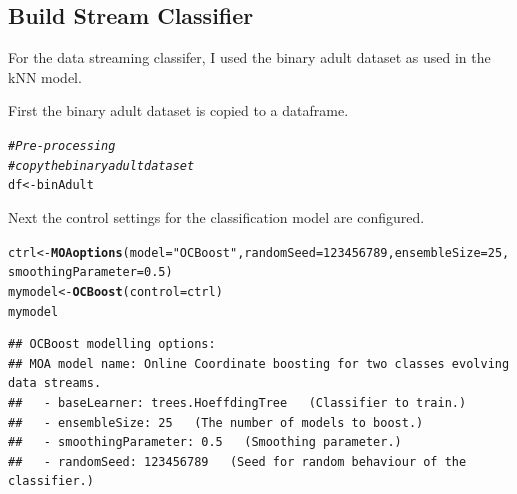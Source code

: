 \documentclass[10pt  ,usenames, dvipsnames]{article}\usepackage[]{graphicx}\usepackage[]{color}
\makeatletter
\newcommand{\hlnum}[1]{\textcolor[rgb]{0.686,0.059,0.569}{#1}}%
\newcommand{\hlstr}[1]{\textcolor[rgb]{0.192,0.494,0.8}{#1}}%
\newcommand{\hlcom}[1]{\textcolor[rgb]{0.678,0.584,0.686}{\textit{#1}}}%
\newcommand{\hlstd}[1]{\textcolor[rgb]{0.345,0.345,0.345}{#1}}%
\newcommand{\hlkwb}[1]{\textcolor[rgb]{0.69,0.353,0.396}{#1}}%
\newcommand{\hlkwc}[1]{\textcolor[rgb]{0.333,0.667,0.333}{#1}}%
\newcommand{\hlkwd}[1]{\textcolor[rgb]{0.737,0.353,0.396}{\textbf{#1}}}%
\newenvironment{kframe}{%
 \def\at@end@of@kframe{}%
 \ifinner\ifhmode%
  \def\at@end@of@kframe{\end{minipage}}%
  \begin{minipage}{\columnwidth}%
 \fi\fi%
 \def\FrameCommand##1{\hskip\@totalleftmargin \hskip-\fboxsep
 \colorbox{shadecolor}{##1}\hskip-\fboxsep
     \hskip-\linewidth \hskip-\@totalleftmargin \hskip\columnwidth}%
 \MakeFramed {\advance\hsize-\width
   \@totalleftmargin\z@ \linewidth\hsize
   \@setminipage}}%
 {\par\unskip\endMakeFramed%
 \at@end@of@kframe}
\newenvironment{knitrout}{}{} %
\makeatother
\begin{document}
\clearpage

\subsection{Build Stream Classifier}

For the data streaming classifer, I used the binary adult dataset as used in the kNN model.

First the binary adult dataset is copied to a dataframe.

\begin{knitrout}
\color{fgcolor}\begin{kframe}
\begin{alltt}
\hlcom{#Pre-processing}
\hlcom{#copy the binary adult dataset}
\hlstd{df} \hlkwb{<-} \hlstd{binAdult}
\end{alltt}
\end{kframe}
\end{knitrout}



Next the control settings for the classification model are configured.

\begin{knitrout}
\color{fgcolor}\begin{kframe}
\begin{alltt}
\hlstd{ctrl} \hlkwb{<-} \hlkwd{MOAoptions}\hlstd{(}\hlkwc{model} \hlstd{=} \hlstr{"OCBoost"}\hlstd{,} \hlkwc{randomSeed} \hlstd{=} \hlnum{123456789}\hlstd{,} \hlkwc{ensembleSize} \hlstd{=} \hlnum{25}\hlstd{,}
                   \hlkwc{smoothingParameter} \hlstd{=} \hlnum{0.5}\hlstd{)}
\hlstd{mymodel} \hlkwb{<-} \hlkwd{OCBoost}\hlstd{(}\hlkwc{control} \hlstd{= ctrl)}
\hlstd{mymodel}
\end{alltt}
\end{kframe}
\end{knitrout}


\begin{knitrout}
\color{fgcolor}\begin{kframe}
\begin{verbatim}
## OCBoost modelling options: 
## MOA model name: Online Coordinate boosting for two classes evolving data streams.
##   - baseLearner: trees.HoeffdingTree   (Classifier to train.)
##   - ensembleSize: 25   (The number of models to boost.)
##   - smoothingParameter: 0.5   (Smoothing parameter.)
##   - randomSeed: 123456789   (Seed for random behaviour of the classifier.)
\end{verbatim}
\end{kframe}
\end{knitrout}
\end{document}
